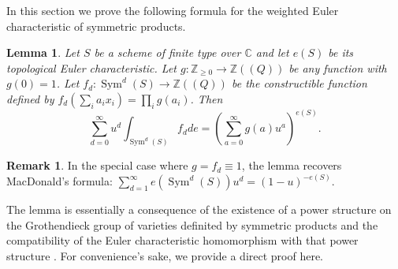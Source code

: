 \documentclass{amsart}
\newtheorem{lemma}[theorem]{Lemma}
\theoremstyle{definition}
\newtheorem{remark}[theorem]{Remark}
\newcommand{\CC} {\mathbb{C}}          %
\newcommand{\ZZ} {\mathbb{Z}}		%
\newcommand{\Sym}{\operatorname{Sym}}
\begin{document}
In this section we prove the following formula for the weighted Euler
characteristic of symmetric products.

\begin{lemma}\label{lem: formula for euler char of sym products}
Let $S$ be a scheme of finite type over $\CC $ and let $e (S)$ be its
topological Euler characteristic. Let $g:\ZZ _{\geq 0}\to \ZZ ((Q))$
be any function with $g (0)=1$. Let $f_{d}:\Sym ^{d} (S)\to \ZZ ((Q))$
be the constructible function defined by $f_{d} (\sum_{i}
a_{i}x_{i})=\prod _{i}g (a_{i})$. Then
\[
\sum _{d=0}^{\infty } u^{d} \int _{\Sym ^{d} (S)} f_{d} de =
\left(\sum _{a=0}^{\infty }g (a) u^{a} \right)^{e (S)}.
\]
\end{lemma}

\begin{remark} \label{MacD}
In the special case where $g=f_{d}\equiv  1$, the lemma recovers
MacDonald's formula: $\sum _{d=1}^{\infty }e (\Sym ^{d} (S)) u^{d} =
(1-u)^{-e (S)}$. 

The lemma is essentially a consequence of the existence of a power
structure on the Grothendieck group of varieties definited by
symmetric products and the compatibility of the Euler characteristic
homomorphism with that power structure \cite{}. For convenience's
sake, we provide a direct proof here.
\end{remark}
\end{document}
